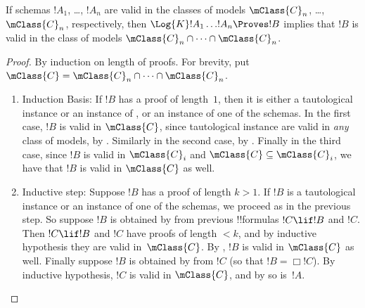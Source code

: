 \documentclass[../../../include/open-logic-section]{subfiles}
\begin{document}


\begin{thm}
  If schemas $!A_1$, \dots, $!A_n$ are valid in the
  classes of models $\mClass{C}_n$, \dots, $\mClass{C}_n$,
  respectively, then $\Log{K}!A_1\dots !A_n
  \Proves !B$ implies that $!B$ is valid in the class of
  models $\mClass{C}_n \cap \dots \cap \mClass{C}_n$.
\end{thm}

\begin{proof}
  By induction on length of proofs. For brevity, put $\mClass{C} =
  \mClass{C}_n \cap \dots \cap \mClass{C}_n$.
  \begin{enumerate}
  \item Induction Basis: If $!B$ has a proof of length~$1$, then it is
    either a tautological instance or an instance of , or an
    instance of one of the schemas. In the first case, $!B$ is valid
    in $\mClass{C}$, since tautological instance are valid in
    \emph{any} class of models, by
    . Similarly in the second case, by
    . Finally in the third case, since
    $!B$ is valid in $\mClass{C}_i$ and $\mClass{C} \subseteq
    \mClass{C}_i$, we have that $!B$ is valid in $\mClass{C}$ as well.
  \item Inductive step: Suppose $!B$ has a proof of length $k>1$. If
    $!B$ is a tautological instance or an instance of one of the
    schemas, we proceed as in the previous step. So suppose $!B$ is
    obtained by \MP{} from previous !!{formula}s $!C \lif !B$ and
    $!C$. Then $!C \lif !B$ and $!C$ have proofs of length $<k$, and
    by inductive hypothesis they are valid in~$\mClass{C}$. By
    , $!B$ is valid in $\mClass{C}$ as
    well. Finally suppose $!B$ is obtained by \Nec{} from $!C$ (so
    that $!B = \Box!C$). By inductive hypothesis, $!C$ is valid in
    $\mClass{C}$, and by  so is~$!A$. \qedhere
  \end{enumerate}
\end{proof}
\end{document}
